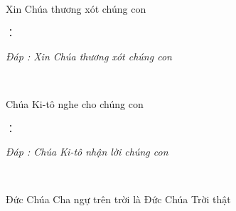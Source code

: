 \documentclass[12pt]{article}
\begin{document}
\begin{paracol}{2}
\begin{leftcolumn*}
\Large{\ \ \ \ \ }\\
\end{leftcolumn*}

\begin{rightcolumn}
Xin Chúa thương xót chúng con\\
\end{rightcolumn}

\begin{leftcolumn*}
\Large{：\ \ \ \ \ \ }\\
\end{leftcolumn*}

\begin{rightcolumn}
\textit{Đáp : Xin Chúa thương xót chúng con}\\
\end{rightcolumn}

\begin{leftcolumn*}
\Large{\ \ \ \ \ \ \ }\\
\end{leftcolumn*}

\begin{rightcolumn}
Chúa Ki-tô nghe cho chúng con\\
\end{rightcolumn}

\begin{leftcolumn*}
\Large{：\ \ \ \ \ \ \ \ }\\
\end{leftcolumn*}

\begin{rightcolumn}
\textit{Đáp : Chúa Ki-tô nhận lời chúng con}\\
\end{rightcolumn}

\begin{leftcolumn*}
\Large{\ \ \ \ \ }\\
\end{leftcolumn*}

\begin{rightcolumn}
Đức Chúa Cha ngự trên trời là Đức Chúa Trời thật\\
\end{rightcolumn}


\end{paracol}
\end{document}
